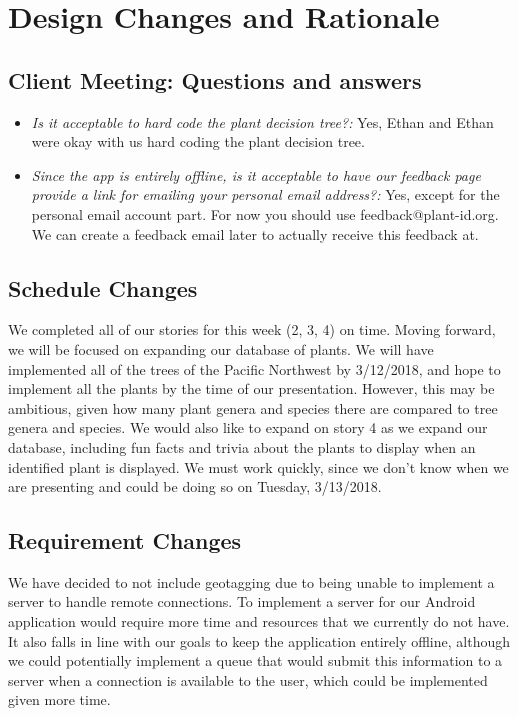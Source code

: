 \documentclass[a4paper]{article}
\begin{document}
\section{Design Changes and Rationale}
\subsection{Client Meeting: Questions and answers}
\begin{itemize}
\item \textit{Is it acceptable to hard code the plant decision tree?:} Yes, Ethan and Ethan were okay with us hard coding the plant decision tree.
\item \textit{Since the app is entirely offline, is it acceptable to have our feedback page provide a link for emailing your personal email address?:} Yes, except for the personal email account part.  For now you should use feedback@plant-id.org. We can create a feedback email later to actually receive this feedback at.
\end{itemize}
\subsection{Schedule Changes}
We completed all of our stories for this week (2, 3, 4) on time. Moving forward, we will be focused on expanding our database of plants. We will have implemented all of the trees of the Pacific Northwest by 3/12/2018, and hope to implement all the plants by the time of our presentation. However, this may be ambitious, given how many plant genera and species there are compared to tree genera and species. We would also like to expand on story 4 as we expand our database, including fun facts and trivia about the plants to display when an identified plant is displayed. We must work quickly, since we don't know when we are presenting and could be doing so on Tuesday, 3/13/2018. 

\subsection{Requirement Changes}
We have decided to not include geotagging due to being unable to implement a server to handle remote connections. To implement a server for our Android application would require more time and resources that we currently do not have. It also falls in line with our goals to keep the application entirely offline, although we could potentially implement a queue that would submit this information to a server when a connection is available to the user, which could be implemented given more time.
\end{document}
